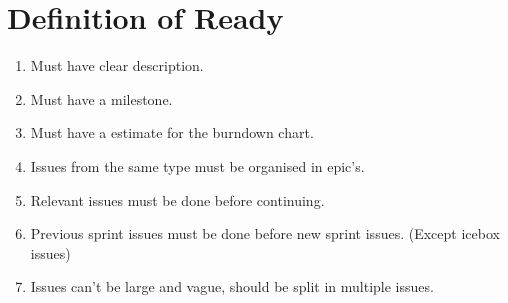 \section{Definition of Ready}
\begin{enumerate}
    \item Must have clear description.
    \item Must have a milestone.
    \item Must have a estimate for the burndown chart.
    \item Issues from the same type must be organised in epic's.
    \item Relevant issues must be done before continuing.
    \item Previous sprint issues must be done before new sprint issues. (Except icebox issues)
    \item Issues can't be large and vague, should be split in multiple issues.
\end{enumerate}
